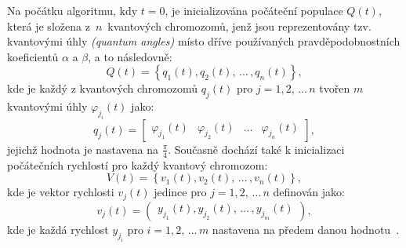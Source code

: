 Na počátku algoritmu, kdy $t=0$, je inicializována počáteční populace $Q\left(t\right)$, která je složena z~$n$~kvantových chromozomů, jenž jsou reprezentovány tzv. kvantovými úhly \emph{(quantum angles)} místo dříve používaných pravděpodobnostních koeficientů $\alpha$ a $\beta$, a to následovně:
\begin{equation*}
    Q\left(t\right) = \left\{q_1\left(t\right), q_2\left(t\right),\,\dots\,,q_n\left(t\right)\right\},
\end{equation*}
kde je každý z kvantových chromozomů $q_j\left(t\right)$ pro $j=1,2,\,\dots\,n$ tvořen $m$ kvantovými úhly $\varphi_{j_i}\left(t\right)$ jako:
\begin{equation*}
    q_j\left(t\right) = \begin{bmatrix} \varphi_{j_1}\left(t\right) & \varphi_{j_2}\left(t\right) & \dots & \varphi_{j_n}\left(t\right) \end{bmatrix},
\end{equation*}
jejichž hodnota je nastavena na $\frac{\pi}{4}$.
Současně dochází také k inicializaci počátečních rychlostí pro každý kvantový chromozom:
\begin{equation*}
    V\left(t\right) = \left\{ v_1\left(t\right), v_2\left(t\right) ,\,\dots\,, v_n\left(t\right)\right\},
\end{equation*}
kde je vektor rychlosti $v_j\left(t\right)$ jedince pro $j=1,2,\,\dots\,n$ definován jako:
\begin{equation*}
    v_j\left(t\right) = \begin{pmatrix} y_{j_1}\left(t\right), y_{j_2}\left(t\right),\,\dots\,, y_{j_m}\left(t\right) \end{pmatrix},
\end{equation*}
kde je každá rychlost $y_{j_i}$ pro $i=1,2,\,\dots\,m$ nastavena na předem danou hodnotu~\cite{qse}.

